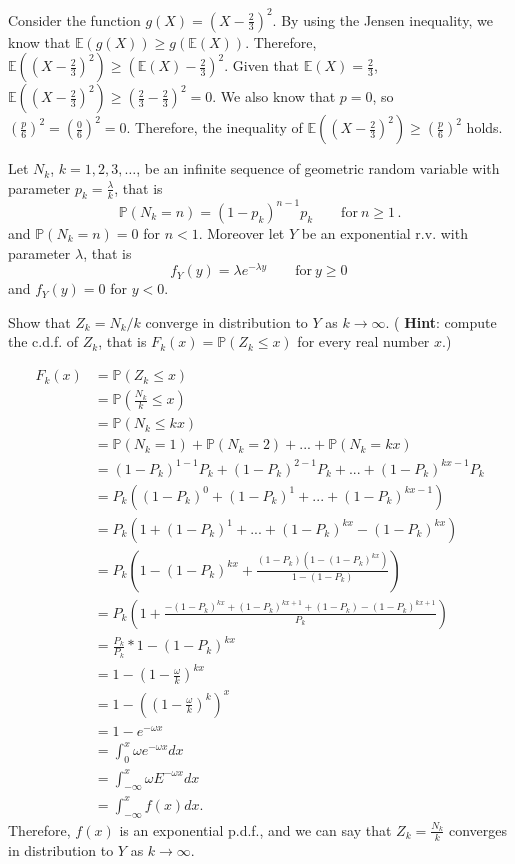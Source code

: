 \documentclass[letterpaper,12pt,addpoints]{exam}
\renewcommand{\Pr}{\mathbb{P}}
\begin{document}
\begin{questions}
\begin{parts}
Consider the function $g(X)=(X-\frac{2}{3})^2$. By using the Jensen inequality, we know that $\mathbb{E}(g(X))\geq g(\mathbb{E}(X))$. Therefore, $\mathbb{E}((X-\frac{2}{3})^2)\geq (\mathbb{E}(X)-\frac{2}{3})^2$. Given that $\mathbb{E}(X)=\frac{2}{3}$, $\mathbb{E}((X-\frac{2}{3})^2)\geq (\frac{2}{3}-\frac{2}{3})^2=0$. We also know that $p=0$, so $(\frac{p}{6})^2=(\frac{0}{6})^2=0$. Therefore, the inequality of $\mathbb{E}((X-\frac{2}{3})^2)\geq (\frac{p}{6})^2$ holds.

\vspace*{\fill}


\end{parts}

\vspace*{\fill}\eject




\question[15] Let $N_k$, $k=1,2,3,\ldots$, be an infinite sequence of 
geometric random variable with parameter $p_k=\frac{\lambda}k$, that is
\[
 \Pr(N_k=n)=(1-p_k)^{n-1}p_k \qquad\mathrm{for\ } n\geq1\, .
\]
and $\Pr(N_k=n)=0$ for $n<1$.
Moreover let $Y$ be an exponential r.v. with parameter $\lambda$, that is
\[
 f_Y(y)=\lambda e^{-\lambda y}\qquad\mathrm{for\ } y\geq 0\,
\]
and $f_Y(y)=0$ for $y<0$.

Show that $Z_k=N_k/k$ converge in distribution to $Y$ as $k\to\infty$. ({\bf 
Hint}: compute the c.d.f. of $Z_k$, that is $F_k(x)=\Pr(Z_k\leq x)$ for every 
real number $x$.)

\begin{align*}
    F_k(x) &= \mathbb{P}(Z_k\leq x)\\
    &= \mathbb{P}(\frac{N_k}{k}\leq x)\\
    &= \mathbb{P}(N_k\leq kx)\\
    &= \mathbb{P}(N_k=1)+\mathbb{P}(N_k=2)+...+\mathbb{P}(N_k=kx)\\
    &= (1-P_k)^{1-1}P_k+(1-P_k)^{2-1}P_k+...+(1-P_k)^{kx-1}P_k\\
    &= P_k((1-P_k)^0+(1-P_k)^1+...+(1-P_k)^{kx-1})\\
    &= P_k(1+(1-P_k)^1+...+(1-P_k)^{kx}-(1-P_k)^{kx})\\
    &= P_k(1-(1-P_k)^{kx}+\frac{(1-P_k)(1-(1-P_k)^{kx})}{1-(1-P_k)})\\
    &= P_k(1+\frac{-(1-P_k)^{kx}+(1-P_k)^{kx+1}+(1-P_k)-(1-P_k)^{kx+1}}{P_k})\\
    &= \frac{P_k}{P_k}*1-(1-P_k)^{kx}\\
    &= 1-(1-\frac{\omega }{k})^{kx}\\
    &= 1-((1-\frac{\omega }{k})^k)^x\\
    &= 1-e^{-\omega  x}\\
    &= \int_0^x\omega e^{-\omega  x}dx\\
    &= \int_{-\infty}^x\omega E^{-\omega  x}dx\\
    &= \int_{-\infty}^xf(x)dx.
\end{align*} Therefore, $f(x)$ is an exponential p.d.f., and we can say that $Z_k=\frac{N_k}{k}$ converges in distribution to $Y$ as $k\rightarrow \infty$.


\end{questions}
\end{document}
